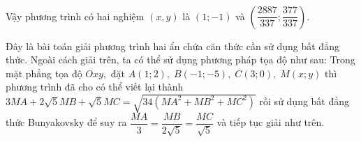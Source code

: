 \begin{bt}
{{\begin{eqnarray*}
	\end{eqnarray*}	 
	 }
		Vậy phương trình có hai nghiệm $\left ( x,y \right ) $ là $\left ( 1;-1 \right ) $ và $\left ( \dfrac{2887}{337} ;\dfrac{377}{337}\right ).
		$
		\begin{nx}
			Đây là bài toán giải phương trình hai ẩn chứa căn thức cần sử dụng bất đẳng thức. Ngoài cách giải trên, ta có thể sử dụng phương pháp tọa độ như sau:
			Trong mặt phẳng tọa độ $Oxy,$ đặt $A\left ( 1;2 \right ),\;B\left ( -1;-5 \right ),\;C\left ( 3;0 \right ),\;M\left ( x;y \right ) $ thì phương trình đã cho có thể viết lại thành $3MA+2\sqrt{5}MB+\sqrt{5}MC=\sqrt{34\left ( MA^2+MB^2+MC^2 \right )} $ rồi sử dụng bất đẳng thức Bunyakovsky để suy ra $\dfrac{MA}{3}=\dfrac{MB}{2\sqrt{5}}=\dfrac{MC}{\sqrt{5}}$ và tiếp tục giải như trên.
		\end{nx}
	}
\end{bt}

